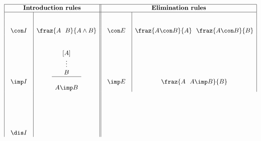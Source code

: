 \renewcommand{\arraystretch}{0.5}
\begin{figure}[htbp]
\[
	\begin{array}{|c|c||c|c|} \hline
	\multicolumn{2}{|c||}{\mbox{\bf Introduction rules}} &
	\multicolumn{2}{c|}{\mbox{\bf Elimination rules}} \\ \hline
	& & &\\
	& & &\\
	\con I  & 
	\fraz{A \ \ B}
     {A \wedge B}
	&
	\con E  & 
	\fraz{A \con B}
     {A}
	\ \ 
	\fraz{A \con B}
	     {B}
	\\
	\begin{array}{l}
	\\ \\ \\ \\ \\
	\imp I   
	\end{array}
	& 
	\begin{array}{c}
	\\ \\
	{[A]}\\
	\vdots\\
	B\\
	\hline\\
	A \imp B
	\end{array}
	&
	\begin{array}{l}
	\\ \\ \\ \\ \\
	\imp E  
	\end{array}
	& 
	\begin{array}{c}
	\\ \\ \\ \\ \\
	\fraz{A \ \ A \imp B}
	     {B}
	\end{array}
	\\
	\begin{array}{l}
	\\ \\ \\ \\ \\
	\dis I
	\end{array}
	& 
	\begin{array}{c}
	\\ \\ \\ \\ \\

\end{array}
\end{array}\]
\end{figure}
